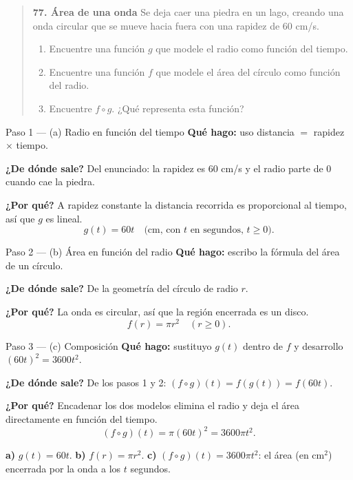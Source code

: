 \documentclass[11pt]{article}
\begin{document}
\begin{quote}
\textbf{77. Área de una onda} \quad Se deja caer una piedra en un lago, creando una onda circular que se mueve hacia fuera con una rapidez de 60 cm/s.
\begin{enumerate}[label=\emph{\alph*})]
\item Encuentre una función $g$ que modele el radio como función del tiempo.
\item Encuentre una función $f$ que modele el área del círculo como función del radio.
\item Encuentre $f\circ g$. ¿Qué representa esta función?
\end{enumerate}
\end{quote}

\begin{paso}{Paso 1 --- (a) Radio en función del tiempo}
\textbf{Qué hago:} uso distancia $=$ rapidez $\times$ tiempo.

\textbf{¿De dónde sale?} Del enunciado: la rapidez es $60$ cm/s y el radio parte de $0$ cuando cae la piedra.

\textbf{¿Por qué?} A rapidez constante la distancia recorrida es proporcional al tiempo, así que $g$ es lineal.
\[
g(t)=60t \quad\text{(cm, con $t$ en segundos, $t\ge 0$)}.
\]
\end{paso}

\begin{paso}{Paso 2 --- (b) Área en función del radio}
\textbf{Qué hago:} escribo la fórmula del área de un círculo.

\textbf{¿De dónde sale?} De la geometría del círculo de radio $r$.

\textbf{¿Por qué?} La onda es circular, así que la región encerrada es un disco.
\[
f(r)=\pi r^2 \quad (r\ge 0).
\]
\end{paso}

\begin{paso}{Paso 3 --- (c) Composición}
\textbf{Qué hago:} sustituyo $g(t)$ dentro de $f$ y desarrollo $(60t)^2=3600t^2$.

\textbf{¿De dónde sale?} De los pasos 1 y 2: $(f\circ g)(t)=f(g(t))=f(60t)$.

\textbf{¿Por qué?} Encadenar los dos modelos elimina el radio y deja el área directamente en función del tiempo.
\[
(f\circ g)(t)=\pi(60t)^2=3600\pi t^2 .
\]
\end{paso}

\begin{resp}
\textbf{a)} $g(t)=60t$. \quad \textbf{b)} $f(r)=\pi r^2$. \quad \textbf{c)} $(f\circ g)(t)=3600\pi t^2$: el área (en cm$^2$) encerrada por la onda a los $t$ segundos.
\end{resp}
\end{document}
